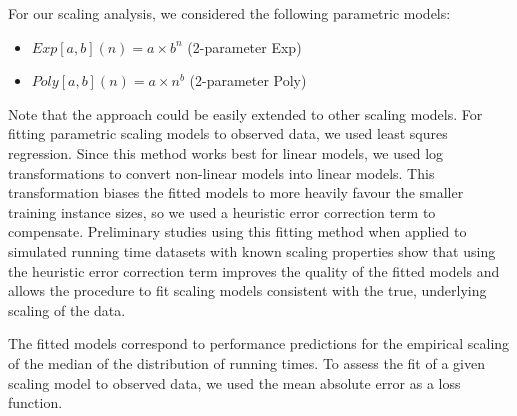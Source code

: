 For our scaling analysis, we considered the following parametric models:
\begin{itemize} 
\item $Exp\left[a,b\right]\left(n\right)=a\times b^{n}$ \quad{}(2-parameter Exp)\item $Poly\left[a,b\right]\left(n\right)=a\times n^{b}$ \quad{}(2-parameter Poly)\end{itemize}
Note that the approach could be easily extended to other scaling models.
For fitting parametric scaling models to observed data, we used
%
least squres
%
regression.
Since this method works best for linear models, we used
log transformations to convert
non-linear models into linear models. This transformation biases the
fitted models to more heavily favour the smaller training instance
sizes, so we used a heuristic error correction term to compensate.
Preliminary studies using this fitting method when applied to simulated
running time datasets with known scaling properties show that using the
heuristic error correction term improves the quality of the fitted models
and allows the procedure to fit scaling models consistent with the true,
underlying scaling of the data.

The fitted models correspond to performance predictions for the empirical
scaling of the median of the distribution of running times.
%
To assess the fit of a given
scaling model to observed data, we used the mean absolute error as a loss function.

